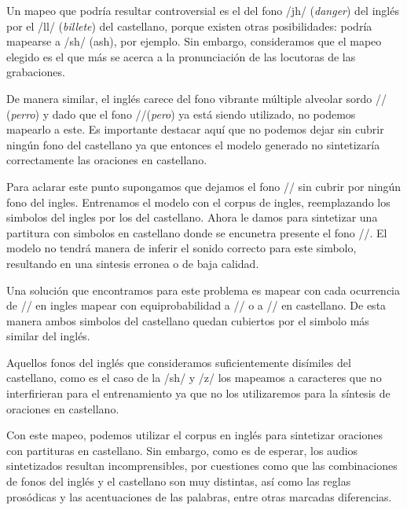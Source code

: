Un mapeo que podría resultar controversial es el del fono /jh/ (\textit{danger}) del inglés por el /ll/ (\textit{billete}) del castellano, porque existen otras posibilidades: podría mapearse a /sh/ (ash), por ejemplo. Sin embargo, consideramos que el mapeo elegido es el que más se acerca a la pronunciación de las locutoras de las grabaciones.

De manera similar, el inglés carece del fono vibrante múltiple alveolar sordo // (\textit{perro}) y dado que el fono //(\textit{pero})  ya está siendo utilizado, no podemos mapearlo a este. Es importante destacar aquí que no podemos dejar sin cubrir ningún fono del castellano ya que entonces el modelo generado no sintetizaría correctamente las oraciones en castellano. 

Para aclarar este punto supongamos que dejamos el fono // sin cubrir por ningún fono del ingles. Entrenamos el modelo con el corpus de ingles, reemplazando los simbolos del ingles por los del castellano. Ahora le damos para sintetizar una partitura con simbolos en castellano donde se encunetra presente el fono //. El modelo no tendrá manera de inferir el sonido correcto para este simbolo, resultando en una sintesis erronea o de baja calidad. 

Una solución que encontramos para este problema es mapear con cada ocurrencia de // en ingles mapear con equiprobabilidad a // o a // en castellano. De esta manera ambos simbolos del castellano quedan cubiertos por el simbolo más similar del inglés.

Aquellos fonos del inglés que consideramos suficientemente disímiles del castellano, como es el caso de la /sh/ y /z/ los mapeamos a caracteres que no interfirieran para el entrenamiento ya que no los utilizaremos para la síntesis de oraciones en castellano.

Con este mapeo, podemos utilizar el corpus en inglés para sintetizar oraciones con partituras en castellano. Sin embargo, como es de esperar, los audios sintetizados resultan incomprensibles, por cuestiones como que las combinaciones de fonos del inglés y el castellano son muy distintas, así como las reglas prosódicas y las acentuaciones de las palabras, entre otras marcadas diferencias.

